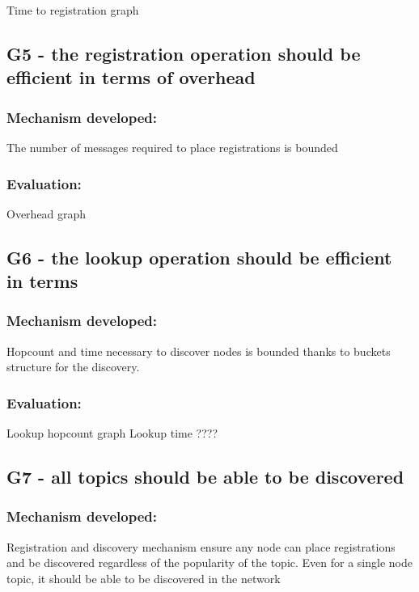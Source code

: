 Time to registration graph

\subsection{G5 - the registration operation should be efficient in terms of overhead}

\subsubsection{Mechanism developed:} 

The number of messages required to place registrations is bounded

\subsubsection{Evaluation: }

Overhead graph

\subsection{G6 - the lookup operation should be efficient in terms }

\subsubsection{Mechanism developed:} 

Hopcount and time necessary to discover nodes is bounded thanks to buckets structure for the discovery.

\subsubsection{Evaluation: }

Lookup hopcount graph
Lookup time ???? 

\subsection{G7 - all topics should be able to be discovered}

\subsubsection{Mechanism developed:} 

Registration and discovery mechanism ensure any node can place registrations and be discovered regardless of the popularity of the topic. 
Even for a single node topic, it should be able to be discovered in the network 


